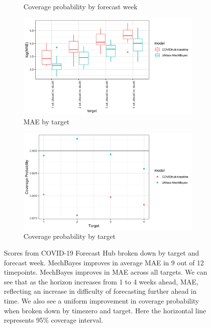 \documentclass{umassthesis}          %
\begin{document}
\begin{figure}
\begin{subfigure}{.5\textwidth}
    \caption{Coverage probability by forecast week}
\end{subfigure}
\begin{subfigure}{.5\textwidth}
  \centering
    \includegraphics[scale=.135]{mae_results_by_target_inc.png}
    \caption{MAE by target}
\end{subfigure}%
\begin{subfigure}{.5\textwidth}
  \centering
    \includegraphics[scale=.115]{cp_results_by_target.png}
    \caption{Coverage probability by target}
\end{subfigure}%

\caption{Scores from COVID-19 Forecast Hub broken down by target and forecast week. MechBayes improves in average MAE in 9 out of 12 timepoints. MechBayes improves in MAE across all targets. We can see that as the horizon increases from 1 to 4 weeks ahead, MAE, reflecting an increase in difficulty of forecasting further ahead in time. We also see a uniform improvement in coverage probability when broken down by timezero and target. Here the horizontal line represents 95\% coverage interval. }
\label{fig:covidhub}
\end{figure}
\end{document}
